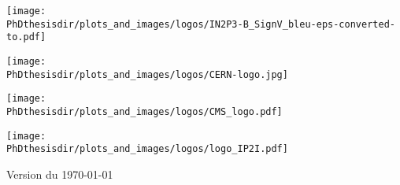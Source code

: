\begin{center}


\vspace{.5cm}

\vfill

\begin{minipage}[t]{.225\textwidth}
\begin{center}
\texttt{[image: \\PhDthesisdir/plots\_and\_images/logos/IN2P3-B\_SignV\_bleu-eps-converted-to.pdf]}
\end{center}
\end{minipage}
\hfill
\begin{minipage}[t]{.225\textwidth}
\begin{center}
\texttt{[image: \\PhDthesisdir/plots\_and\_images/logos/CERN-logo.jpg]}
\end{center}
\end{minipage}
\hfill
\begin{minipage}[t]{.225\textwidth}
\begin{center}
\texttt{[image: \\PhDthesisdir/plots\_and\_images/logos/CMS\_logo.pdf]}
\end{center}
\end{minipage}
\hfill
\begin{minipage}[t]{.225\textwidth}
\begin{center}
\texttt{[image: \\PhDthesisdir/plots\_and\_images/logos/logo\_IP2I.pdf]}
\end{center}
\end{minipage}

\vspace{.25cm}

{\scriptsize Version du \today}

\vspace{-1cm}
\end{center}